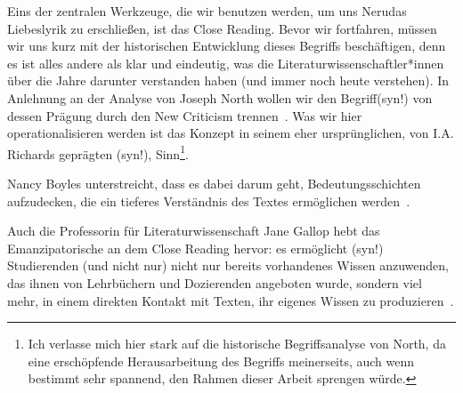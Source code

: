 Eins der zentralen Werkzeuge, die wir benutzen werden, um uns Nerudas Liebeslyrik zu erschließen, ist das Close Reading.
Bevor wir fortfahren, müssen wir uns kurz mit der historischen Entwicklung dieses Begriffs beschäftigen, denn es ist alles andere als klar und eindeutig, was die Literaturwissenschaftler*innen über die Jahre darunter verstanden haben (und immer noch heute verstehen).
In Anlehnung an der Analyse von Joseph North wollen wir den Begriff(syn!) von dessen Prägung durch den New Criticism trennen~\autocite{North2013}.
Was wir hier operationalisieren werden ist das Konzept in seinem eher ursprünglichen, von I.A. Richards geprägten (syn!), Sinn\footnote{Ich verlasse mich hier stark auf die historische Begriffsanalyse von North, da eine erschöpfende Herausarbeitung des Begriffs meinerseits, auch wenn bestimmt sehr spannend, den Rahmen dieser Arbeit sprengen würde.}.

Nancy Boyles unterstreicht, dass es dabei darum geht, Bedeutungsschichten aufzudecken, die ein tieferes Verständnis des Textes ermöglichen werden~\autocite[90]{Boyles2016}.

Auch die Professorin für Literaturwissenschaft Jane Gallop hebt das Emanzipatorische an dem Close Reading hervor: es ermöglicht (syn!) Studierenden (und nicht nur) nicht nur bereits vorhandenes Wissen anzuwenden, das ihnen von Lehrbüchern und Dozierenden angeboten wurde, sondern viel mehr, in einem direkten Kontakt mit Texten, ihr eigenes Wissen zu produzieren~\autocite{Gallop2007}.

